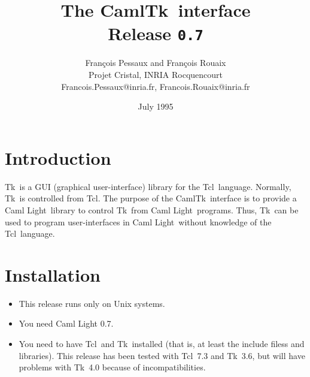 
\newif\ifplaintext
\plaintextfalse


\newcommand{\tcl}	{{\sf Tcl}}
\newcommand{\tk}	{{\sf Tk}}
\newcommand{\caml}	{{\sf Caml Light}}
\newcommand{\camltk}	{{\sf CamlTk}}
\newcommand{\wish}	{{\sf wish}}
\newcommand{\thisrelease}{{\tt 0.7}}

\title{The \camltk\ interface \\
       Release \thisrelease}

\author{Fran\c{c}ois Pessaux and Fran\c{c}ois Rouaix \\
           Projet Cristal, INRIA Rocquencourt \\
        {\small Francois.Pessaux@inria.fr, Francois.Rouaix@inria.fr}
        }
\date{July 1995}


\maketitle
\tableofcontents
\newpage

\section*{Introduction}

\tk\ is a GUI (graphical user-interface) library for the \tcl\ language.
Normally, \tk\ is controlled from \tcl. The purpose of the \camltk\
interface is to provide a \caml\ library to control \tk\ from \caml\
programs. Thus, \tk\ can be used to program user-interfaces in \caml\
without knowledge of the \tcl\ language.

\section*{Installation}

\begin{itemize}
\item This release runs only on Unix systems.
\item You need Caml Light 0.7.
\item You need to have \tcl\ and \tk\ installed (that is, at least the
include filess and libraries). 
This release has been tested with \tcl\ 7.3 and \tk\ 3.6, but will have
problems with \tk\ 4.0 because of incompatibilities.
\end{itemize} 

